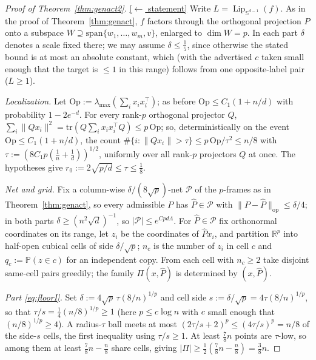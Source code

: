 \documentclass[11pt,reqno]{amsart}
\theoremstyle{plain}
\theoremstyle{definition}
\theoremstyle{remark}
\newcommand{\R}{\mathbb{R}}
\newcommand{\Sd}{\mathbb{S}^{d-1}}
\newcommand{\PP}{\mathbb{P}}
\newcommand{\Lip}{\operatorname{Lip}}
\newcommand{\stmtbutton}[1]{\hyperref[#1]{\textnormal{\footnotesize\textsf{[$\leftarrow$ statement]}}}}
\begin{document}
\begin{proof}[Proof of Theorem~\textup{\ref{thm:genact2}}]\label{proof:genact2}\stmtbutton{thm:genact2}
Write $L=\Lip_{\Sd}(f)$. As in the proof of Theorem~\ref{thm:genact}, $f$ factors through the orthogonal projection $P$ onto a subspace $W\supseteq\mathrm{span}\{w_1,\dots,w_m,v\}$, enlarged to $\dim W=p$. In each part $\delta$ denotes a scale fixed there; we may assume $\delta\le\tfrac15$, since otherwise the stated bound is at most an absolute constant, which (with the advertised $c$ taken small enough that the target is $\le1$ in this range) follows from one opposite-label pair ($L\ge1$).

\emph{Localization.} Let $\mathrm{Op}:=\lambda_{\max}(\sum_ix_ix_i^\top)$; as before $\mathrm{Op}\le C_1(1+n/d)$ with probability $1-2e^{-d}$. For every rank-$p$ orthogonal projector $Q$, $\sum_i\|Qx_i\|^2=\mathrm{tr}(Q\sum_ix_ix_i^\top Q)\le p\,\mathrm{Op}$; so, deterministically on the event $\mathrm{Op}\le C_1(1+n/d)$, the count $\#\{i:\|Qx_i\|>\tau\}\le p\,\mathrm{Op}/\tau^2\le n/8$ with $\tau:=(8C_1p(\tfrac1n+\tfrac1d))^{1/2}$, uniformly over all rank-$p$ projectors $Q$ at once. The hypotheses give $r_0:=2\sqrt{p/d}\le\tau\le\tfrac18$.

\emph{Net and grid.} Fix a column-wise $\delta/(8\sqrt p)$-net $\mathcal P$ of the $p$-frames as in Theorem~\ref{thm:genact}, so every admissible $P$ has $\hat P\in\mathcal P$ with $\|P-\hat P\|_{\mathrm{op}}\le\delta/4$; in both parts $\delta\ge(n^2\sqrt d)^{-1}$, so $|\mathcal P|\le e^{Cpd\Lambda}$. For $\hat P\in\mathcal P$ fix orthonormal coordinates on its range, let $z_i$ be the coordinates of $\hat Px_i$, and partition $\R^p$ into half-open cubical cells of side $\delta/\sqrt p$; $n_c$ is the number of $z_i$ in cell $c$ and $q_c:=\PP(z\in c)$ for an independent copy. From each cell with $n_c\ge2$ take disjoint same-cell pairs greedily; the family $\Pi(x,\hat P)$ is determined by $(x,\hat P)$.

\emph{Part \eqref{eq:floorI}.} Set $\delta:=4\sqrt p\,\tau(8/n)^{1/p}$ and cell side $s:=\delta/\sqrt p=4\tau(8/n)^{1/p}$, so that $\tau/s=\tfrac14(n/8)^{1/p}\ge1$ (here $p\le c\log n$ with $c$ small enough that $(n/8)^{1/p}\ge4$). A radius-$\tau$ ball meets at most $(2\tau/s+2)^p\le(4\tau/s)^p=n/8$ of the side-$s$ cells, the first inequality using $\tau/s\ge1$. At least $\tfrac78n$ points are $\tau$-low, so among them at least $\tfrac78n-\tfrac n8$ share cells, giving $|\Pi|\ge\tfrac12(\tfrac78n-\tfrac n8)=\tfrac38n$.


\end{proof}
\end{document}
